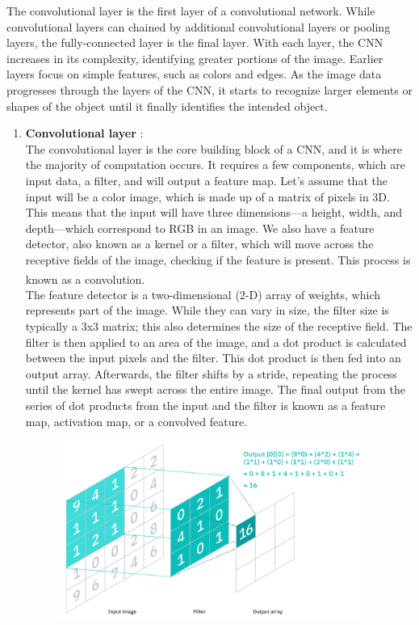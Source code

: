 The convolutional layer is the first layer of a convolutional network. While convolutional layers can chained by additional convolutional layers or pooling layers, the fully-connected layer is the final layer. With each layer, the CNN increases in its complexity, identifying greater portions of the image. Earlier layers focus on simple features, such as colors and edges. As the image data progresses through the layers of the CNN, it starts to recognize larger elements or shapes of the object until it finally identifies the intended object. 
    
    
\begin{enumerate}
    \item \textbf{Convolutional layer} : \\
        The convolutional layer is the core building block of a CNN, and it is where the majority of computation occurs. It requires a few components, which are input data, a filter, and will output a feature map. Let’s assume that the input will be a color image, which is made up of a matrix of pixels in 3D. This means that the input will have three dimensions—a height, width, and depth—which correspond to RGB in an image. We also have a feature detector, also known as a kernel or a filter, which will move across the receptive fields of the image, checking if the feature is present. This process is known as a convolution. \textsuperscript{\cite{CNN-IBM}} \\
        The feature detector is a two-dimensional (2-D) array of weights, which represents part of the image. While they can vary in size, the filter size is typically a 3x3 matrix; this also determines the size of the receptive field. The filter is then applied to an area of the image, and a dot product is calculated between the input pixels and the filter. This dot product is then fed into an output array. Afterwards, the filter shifts by a stride, repeating the process until the kernel has swept across the entire image. The final output from the series of dot products from the input and the filter is known as a feature map, activation map, or a convolved feature.
        \begin{figure}[H]
            \centering
            \includegraphics[width=10cm]{../images/CNN-kernel.png}

\end{figure}
\end{enumerate}
